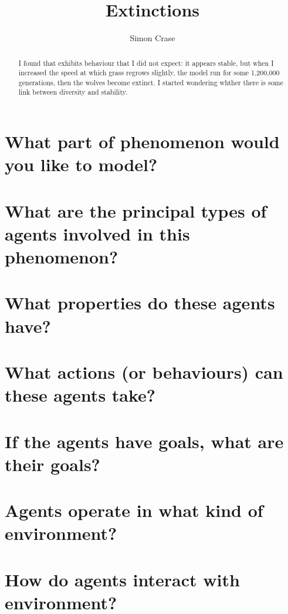 \documentclass[]{article}
\title{Extinctions}
\author{Simon Crase}
\begin{document}
\maketitle

\begin{abstract}
I found that \cite{Wilensky:1999} exhibits behaviour that I did not expect: it appears stable, but when I increased the speed at which grass regrows slightly, the model run for some 1,200,000 generations, then the wolves become extinct. I started wondering whther there is some link between diversity and stability.
\end{abstract}


 
\section{What part of phenomenon would you like to model?}


\section{What are the principal types of agents involved in this phenomenon?}



\section{What properties do these agents have?}





\section{What actions (or behaviours) can these agents take?}



\section{If the agents have goals, what are their goals?}


\section{Agents operate in what kind of environment?}
\section{How do agents interact with environment?}

\medskip



\end{document}
